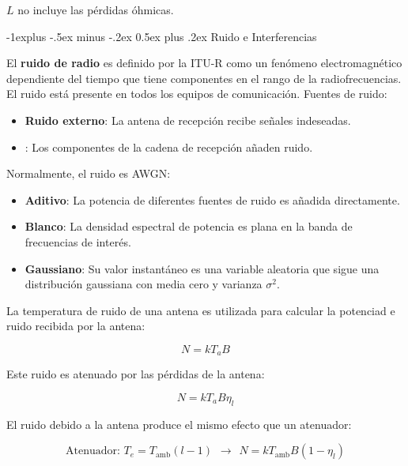 \documentclass[10pt,portrait, twocolumn]{article}
\makeatletter
\renewcommand{\subsection}{\@startsection{subsection}{2}{0mm}%
                                {-1explus -.5ex minus -.2ex}%
                                {0.5ex plus .2ex}%
                                {\normalfont\normalsize\bfseries}}
\makeatother
\begin{document}
$L$ no incluye las pérdidas óhmicas.

\hrulefill

\subsection{Ruido e Interferencias}

El \textbf{ruido de radio} es definido por la ITU-R como un fenómeno electromagnético dependiente del tiempo que tiene componentes en el rango de la radiofrecuencias. El ruido está presente en todos los equipos de comunicación. Fuentes de ruido:

	\begin{itemize}
	\item \textbf{Ruido externo}: La antena de recepción recibe señales indeseadas.
	\item {}: Los componentes de la cadena de recepción añaden ruido.
	\end{itemize}
	
Normalmente, el ruido es AWGN:
	
	\begin{itemize}
	\item \textbf{Aditivo}: La potencia de diferentes fuentes de ruido es añadida directamente.
	\item \textbf{Blanco}: La densidad espectral de potencia es plana en la banda de frecuencias de interés.
	\item \textbf{Gaussiano}: Su valor instantáneo es una variable aleatoria que sigue una distribución gaussiana con media cero y varianza $\sigma^{2}$.
	\end{itemize}

La temperatura de ruido de una antena es utilizada para calcular la potenciad e ruido recibida por la antena:

	\begin{equation*}
	N = k T_{a} B
	\end{equation*}

Este ruido es atenuado por las pérdidas de la antena:

	\begin{equation*}
	N = kT_{a} B \eta_{l}
	\end{equation*}
	
El ruido debido a la antena produce el mismo efecto que un atenuador:

	\begin{equation*}
	\text{Atenuador: } T_{e} = T_{\text{amb}} (l - 1) \hspace{5pt} \rightarrow \hspace{5pt} N = k T_{\text{amb}} B (1 - \eta_{l})
	\end{equation*}
\end{document}
